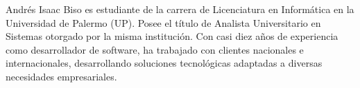 \begin{IEEEbiography}
    {Andrés Isaac Biso} es estudiante de la carrera de Licenciatura en Informática en la Universidad de Palermo (UP).
    Posee el título de Analista Universitario en Sistemas otorgado por la misma institución.
    Con casi diez años de experiencia como desarrollador de software, ha trabajado con clientes nacionales e internacionales,
    desarrollando soluciones tecnológicas adaptadas a diversas necesidades empresariales.
\end{IEEEbiography}

